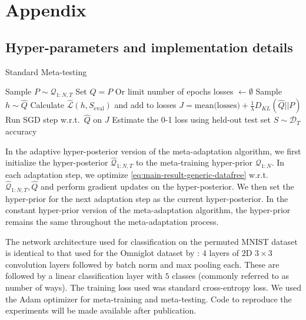 \documentclass[letterpaper]{article} %
\theoremstyle{definition}
\newcommand{\RM}[1]{\textcolor{magenta}{\{RM: #1\}}}
\begin{document}
%


\clearpage
\appendix 
\section{Appendix}
\label{sec:appendix}

\subsection{Hyper-parameters and implementation details} \label{append:hyper-params}

\begin{algorithm}[H]
	\caption{Standard Meta-testing}
	\small
	\begin{algorithmic}
		\State Sample $P\sim \mathcal{Q}_{1:N, T}$
		\State Set $\hat{Q}=P$
		 \Comment Or limit number of epochs
			\State losses $\leftarrow \emptyset$
				\State Sample $h\sim \hat{Q}$
				\State Calculate $\hat{\mathcal{L}}(h,S_{\mathrm{eval}})$ and add to losses
			\EndFor
			\State $J=\textrm{mean(losses)}+\frac{1}{\lambda} D_{KL}(\hat{Q}||P)$
			\State Run SGD step w.r.t.\ $\hat{Q}$ on $J$
		\EndWhile
		\State Estimate the 0-1 loss using held-out test set $S\sim \mathcal{D}_T$
		\State \Return accuracy
		\EndFunction
	\end{algorithmic}
\end{algorithm}

In the adaptive hyper-posterior version of the meta-adaptation algorithm, we first initialize the hyper-posterior $\hat{\mathcal{Q}}_{1:N, T}$ to the meta-training hyper-prior $\mathcal{Q}_{1:N}$. In each adaptation step, we optimize \eqref{eq:main-result-generic-datafree} w.r.t.\! $\hat{\mathcal{Q}}_{1:N, T},\hat{Q}$ and perform gradient updates on the hyper-posterior. We then set the hyper-prior for the next adaptation step as the current hyper-posterior.
In the constant hyper-prior version of the meta-adaptation algorithm, the hyper-prior remains the same throughout the meta-adaptation process.

The network architecture used for classification on the permuted MNIST dataset is identical to that used for the Omniglot dataset by \citet{Vinyals2016}: $4$ layers of $2$D $3\times 3$ convolution layers followed by batch norm and max pooling each. These are followed by a linear classification layer with $5$ classes (commonly referred to as number of ways). The training loss used was standard cross-entropy loss. We used the Adam optimizer \citep{Kingma2015} for meta-training and meta-testing. 
Code to reproduce the experiments will be made available after publication.
\end{document}

